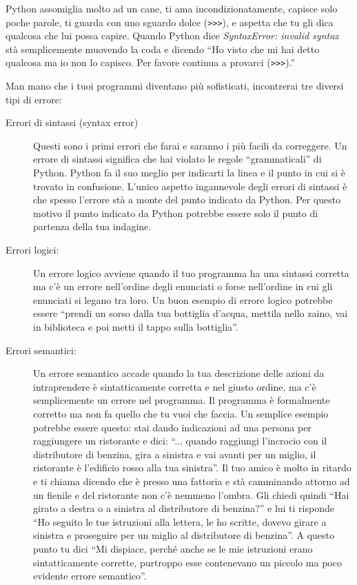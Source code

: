 Python assomiglia molto ad un cane, ti ama incondizionatamente, capisce solo poche parole, ti guarda con uno sguardo dolce  ({\tt >>>}), e aspetta che tu gli dica qualcosa che lui possa capire. Quando Python dice \emph{SyntaxError: invalid syntax} st\`{a} semplicemente muovendo la coda e dicendo {``}Ho visto che mi hai detto qualcosa ma io non lo capisco. Per favore continua a provarci  ({\tt >>>}).''

Man mano che i tuoi programmi diventano pi\`{u} sofisticati, incontrerai tre diversi tipi di errore:

\begin{description}

\item[Errori di sintassi (syntax error)] Questi sono i primi errori che farai e saranno i pi\`{u} facili da correggere. Un errore di sintassi significa che hai violato le regole {``}grammaticali'' di Python. Python fa il suo meglio per indicarti la linea e il punto in cui si \`{e} trovato in confusione. L'unico aspetto ingannevole degli errori di sintassi \`{e} che spesso l'errore st\`{a} a monte del punto indicato da Python. Per questo motivo il punto indicato da Python potrebbe essere solo il punto di partenza della tua indagine.


\item[Errori logici:] Un errore logico avviene quando il tuo programma ha una sintassi corretta ma c'\`{e} un errore nell'ordine degli enunciati o forse nell'ordine in cui gli enunciati si legano tra loro. Un buon esempio di errore logico potrebbe essere {``}prendi un sorso dalla tua bottiglia d'acqua, mettila nello zaino, vai in biblioteca e poi metti il tappo sulla bottiglia''.


\item[Errori semantici:] Un errore semantico accade quando la tua descrizione delle azioni da intraprendere \`{e} sintatticamente corretta e nel giusto ordine, ma c'\`{e} semplicemente un errore nel programma. Il programma \`{e} formalmente corretto ma non fa quello che tu vuoi che faccia. Un semplice esempio potrebbe essere questo: stai dando indicazioni ad una persona per raggiungere un ristorante e dici: {``}... quando raggiungi l'incrocio con il distributore di benzina, gira a sinistra e vai avanti per un miglio, il ristorante \`{e} l'edificio rosso alla tua sinistra''. Il tuo amico \`{e} molto in ritardo e ti chiama dicendo che \`{e} presso una fattoria e st\`{a} camminando attorno ad un fienile e del ristorante non c'\`{e} nemmeno l'ombra. Gli chiedi quindi {``}Hai girato a destra o a sinistra al distributore di benzina?'' e lui ti risponde {``}Ho seguito le tue istruzioni alla lettera, le ho scritte, dovevo girare a sinistra e proseguire per un miglio al distributore di benzina''. A questo punto tu dici {``}Mi dispiace, perch\'{e} anche se le mie istruzioni erano sintatticamente corrette, purtroppo esse contenevano un piccolo ma poco evidente errore semantico''.

\end{description}

